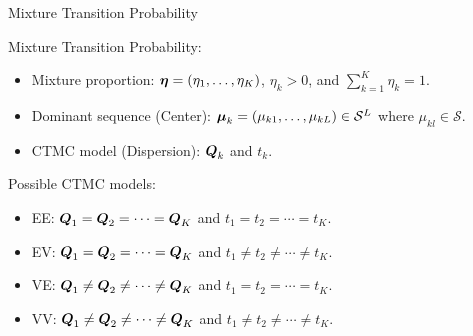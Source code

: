 \documentclass{beamer}
\begin{document}
\begin{frame}{Mixture Transition Probability}

Mixture Transition Probability:
\begin{itemize}

\item
Mixture proportion:
$\boldsymbol{\eta} = (\eta_1, \ldots, \eta_K)$, $\eta_k > 0$, and $\sum_{k = 1}^K \eta_k = 1$.

\item
Dominant sequence (Center):
$\boldsymbol{\mu}_k = (\mu_{k1}, \ldots, \mu_{kL}) \in \mathcal{S}^L$ where
$\mu_{kl} \in \mathcal{S}$.

\item
CTMC model (Dispersion): $\boldsymbol{Q}_k$ and $t_k$.
\end{itemize}

\vspace{0.2cm}
Possible CTMC models:
\begin{itemize}
\item
EE: $\boldsymbol{Q}_1 = \boldsymbol{Q}_2 = \cdots = \boldsymbol{Q}_K$
          and $t_1 = t_2 = \cdots = t_K$.
\item
EV: $\boldsymbol{Q}_1 = \boldsymbol{Q}_2 = \cdots = \boldsymbol{Q}_K$
          and $t_1 \neq t_2 \neq \cdots \neq t_K$.
\item
VE: $\boldsymbol{Q}_1 \neq \boldsymbol{Q}_2 \neq \cdots \neq \boldsymbol{Q}_K$
          and $t_1 = t_2 = \cdots = t_K$.
\item
VV: $\boldsymbol{Q}_1 \neq \boldsymbol{Q}_2 \neq \cdots \neq \boldsymbol{Q}_K$
          and $t_1 \neq t_2 \neq \cdots \neq t_K$.
\end{itemize}

\end{frame}

\end{document}
